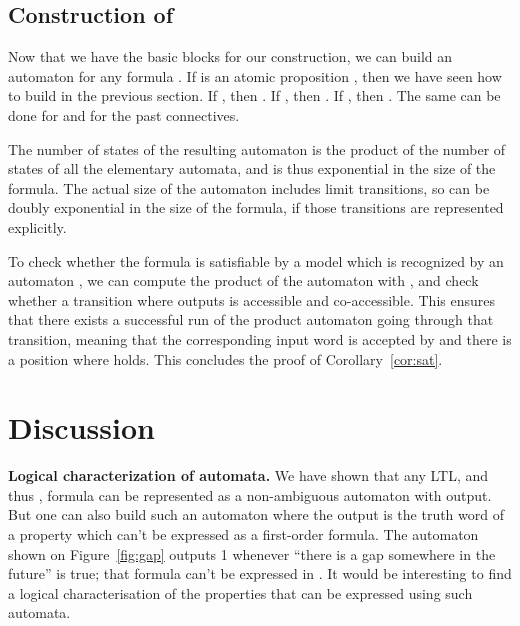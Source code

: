 \documentclass[envcountsame]{fsttcs-ps}
\begin{document}
\subsection{Construction of }

Now that we have the basic blocks for our construction, we can build an
automaton for any formula .  If  is an atomic proposition
, then we have seen how to build  in the previous section.  If
, then .
If , then .  If , then
.
The same can be done for  and for the past connectives.

The number of states of the resulting automaton is the product of the number
of states of all the elementary automata, and is thus exponential in the size
of the formula.  The actual size of the automaton includes limit transitions,
so can be doubly exponential in the size of the formula, if those transitions
are represented explicitly.

To check whether the formula  is satisfiable by a model which is
recognized by an automaton , we can compute the product of the automaton
 with , and check whether a transition where 
outputs  is accessible and co-accessible.  This ensures that there exists a
successful run of the product automaton going through that transition, meaning
that the corresponding input word is accepted by  and there is a position
where  holds.  This concludes the proof of Corollary~\ref{cor:sat}.



\section{Discussion}
\label{s:discuss}

\noindent \textbf{Logical characterization of automata.} We have shown that
any LTL, and thus , formula can be represented as a non-ambiguous
automaton with output.  But one can also build such an automaton where the
output is the truth word of a property which can't be expressed as a
first-order formula.  The automaton shown on Figure~\ref{fig:gap} outputs 1
whenever ``there is a gap somewhere in the future'' is true; that formula
can't be expressed in .  It would be interesting to find a logical
characterisation of the properties that can be expressed using such automata.
\end{document}

